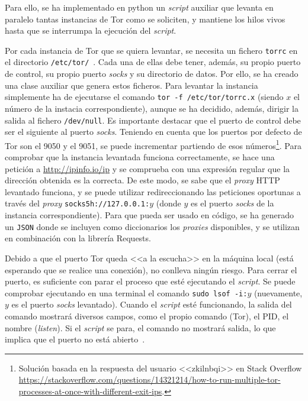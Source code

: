 Para ello, se ha implementado en python un \textit{script} auxiliar que levanta en paralelo tantas instancias de Tor como se soliciten, y mantiene los hilos vivos hasta que se interrumpa la ejecución del \textit{script}.

Por cada instancia de Tor que se quiera levantar, se necesita un fichero \texttt{torrc} en el directorio \texttt{/etc/tor/}~\cite{TorFicherosTor}. Cada una de ellas debe tener, además, su propio puerto de control, su propio puerto \textit{socks} y su directorio de datos. Por ello, se ha creado una clase auxiliar que genera estos ficheros. Para levantar la instancia simplemente ha de ejecutarse el comando \texttt{tor -f /etc/tor/torrc.x} (siendo $x$ el número de la instacia correspondiente), aunque se ha decidido, además, dirigir la salida al fichero \texttt{/dev/null}. Es importante destacar que el puerto de control debe ser el siguiente al puerto \textit{socks}. Teniendo en cuenta que los puertos por defecto de Tor son el 9050 y el 9051, se puede incrementar partiendo de esos números\footnote{Solución basada en la respuesta del usuario <<zkilnbqi>> en Stack Overflow \url{https://stackoverflow.com/questions/14321214/how-to-run-multiple-tor-processes-at-once-with-different-exit-ips}.}. Para comprobar que la instancia levantada funciona correctamente, se hace una petición a \url{http://ipinfo.io/ip} y se comprueba con una expresión regular que la dirección obtenida es la correcta. De este modo, se sabe que el \textit{proxy} HTTP levantado funciona, y se puede utilizar redireccionando las peticiones oportunas a través del \textit{proxy} \texttt{socks5h://127.0.0.1:$y$} (donde $y$ es el puerto \textit{socks} de la instancia correspondiente). Para que pueda ser usado en código, se ha generado un \texttt{JSON} donde se incluyen como diccionarios los \textit{proxies} disponibles, y se utilizan en combinación con la librería Requests.

Debido a que el puerto Tor queda <<a la escucha>> en la máquina local (está esperando que se realice una conexión), no conlleva ningún riesgo. Para cerrar el puerto, es suficiente con parar el proceso que esté ejecutando el \textit{script}. Se puede comprobar ejecutando en una terminal el comando \texttt{sudo lsof -i:$y$} (nuevamente, $y$ es el puerto \textit{socks} levantado). Cuando el \textit{script} esté funcionando, la salida del comando mostrará diversos campos, como el propio comando (Tor), el PID, el nombre (\textit{listen}). Si el \textit{script} se para, el comando no mostrará salida, lo que implica que el puerto no está abierto~\cite{checkOpenTorPorts}.